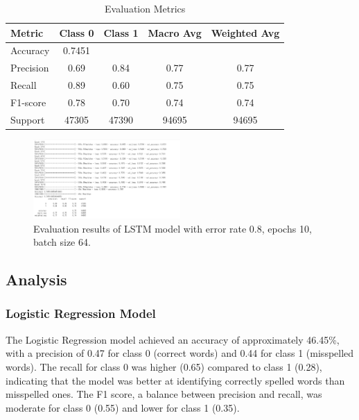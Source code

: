 \begin{table}[ht]
\centering
\caption{Evaluation Metrics}
\label{tab:evaluation_metrics}
\begin{tabular}{|l|c|c|c|c|}
\hline
\textbf{Metric} & \textbf{Class 0} & \textbf{Class 1} & \textbf{Macro Avg} & \textbf{Weighted Avg} \\ \hline
Accuracy        & 0.7451            &                   &                     &                        \\ \hline
Precision       & 0.69              & 0.84              & 0.77                & 0.77                   \\ \hline
Recall          & 0.89              & 0.60              & 0.75                & 0.75                   \\ \hline
F1-score        & 0.78              & 0.70              & 0.74                & 0.74                   \\ \hline
Support         & 47305             & 47390             & 94695               & 94695                  \\ \hline
\end{tabular}
\end{table}

\begin{figure}[h!]
    \centering
    \includegraphics[width=0.5\textwidth]{Figures/ER80_epoch10_batch64.png}
    \caption{Evaluation results of LSTM model with error rate 0.8, epochs 10, batch size 64.}
    \label{fig:lstm_results_0.8_10_64}
\end{figure}

\subsection{Analysis}

\subsubsection{Logistic Regression Model}

The Logistic Regression model achieved an accuracy of approximately 46.45\%, with a precision of 0.47 for class 0 (correct words) and 0.44 for class 1 (misspelled words). The recall for class 0 was higher (0.65) compared to class 1 (0.28), indicating that the model was better at identifying correctly spelled words than misspelled ones. The F1 score, a balance between precision and recall, was moderate for class 0 (0.55) and lower for class 1 (0.35).

